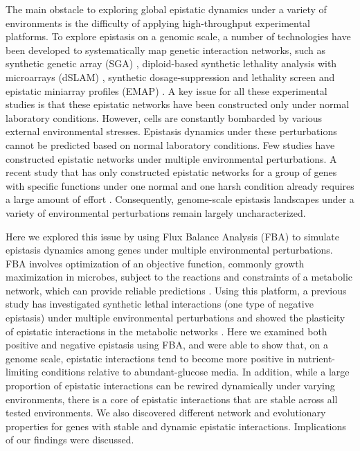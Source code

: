The main obstacle to exploring global epistatic dynamics under a
variety of environments is the difficulty of applying high-throughput
experimental platforms. To explore epistasis on a genomic scale, a
number of technologies have been developed to systematically map
genetic interaction networks, such as synthetic genetic array (SGA)
\citep{Tong2004, Costanzo2010}, diploid-based synthetic lethality
analysis with microarrays (dSLAM) \citep{Pan2004, Pan2006}, synthetic
dosage-suppression and lethality screen \citep{Measday2002,
Measday2005, Sopko2006} and epistatic miniarray profiles (EMAP)
\citep{Collins2007, Fiedler2009, Kornmann2009}. A key issue for all
these experimental studies is that these epistatic networks have been
constructed only under normal laboratory
conditions. However, cells are constantly bombarded by various
external environmental stresses. Epistasis dynamics under these
perturbations cannot be predicted based on normal laboratory
conditions. Few studies have constructed epistatic networks under
multiple environmental perturbations. A recent study that has only
constructed epistatic networks for a group of genes with specific
functions under one normal and one harsh condition already requires a
large amount of effort \citep{Bandyopadhyay2011}. Consequently,
genome-scale epistasis landscapes under a variety of environmental
perturbations remain largely uncharacterized.

Here we explored this issue by using Flux Balance Analysis (FBA) to
simulate epistasis dynamics among genes under multiple environmental
perturbations. FBA involves optimization of an objective function,
commonly growth maximization in microbes, subject to the reactions and
constraints of a metabolic network, which can provide reliable
predictions \citep{Edwards2001, Shlomi2005, Becker2007, Feist2008,
Smallbone2009a, Orth2010}. Using this platform, a previous study has
investigated synthetic lethal interactions (one type of negative
epistasis) under multiple environmental perturbations and showed the
plasticity of epistatic interactions in the metabolic networks
\citep{Harrison2007}. Here we examined both positive and negative
epistasis using FBA,
and were able to show that, on a genome scale, epistatic interactions
tend to become more positive in nutrient-limiting conditions relative
to abundant-glucose media. In addition, while a large proportion of
epistatic interactions can be rewired dynamically under varying
environments, there is a core of epistatic interactions that are
stable across all tested environments. We also discovered different
network and evolutionary properties for genes with stable and dynamic
epistatic interactions. Implications of our findings were discussed.

